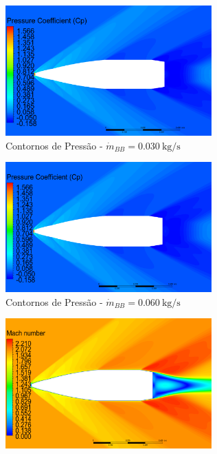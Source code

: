 \begin{figure}[!ht]
	\centering
	\begin{subfigure}[b]{0.47\textwidth}
        \centering
        \includegraphics[width=\textwidth,height=5cm]{contorno-pressao-1500K-vazao-0030-2pol.png}
        \caption{Contornos de Pressão - $\Dot{m}_{BB} = \qty{0,030}{\kilogram\per\second}$}
        \label{fig:contorno-pressao-bb-1500K-vazao0030}
    \end{subfigure}
    \hfill
    \begin{subfigure}[b]{0.47\textwidth}
        \centering
        \includegraphics[width=\textwidth,height=5cm]{contorno-pressao-1500K-vazao-0060-2pol.png}
        \caption{Contornos de Pressão - $\Dot{m}_{BB} = \qty{0,060}{\kilogram\per\second}$}
        \label{fig:contorno-pressao-bb-1500K-vazao0060}
    \end{subfigure}
    \hfill
	\begin{subfigure}[b]{0.47\textwidth}
        \centering
        \includegraphics[width=\textwidth,height=5cm]{contorno-velocidade-1500K-vazao-0030-2pol.png}

\end{subfigure}
\end{figure}
